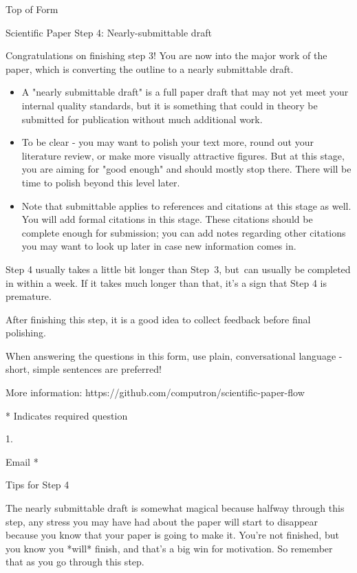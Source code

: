\documentclass[]{article}
\date{}
\begin{document}
Top of Form

Scientific Paper Step 4: Nearly-submittable draft

Congratulations on finishing step 3! You are now into the major work of
the paper, which is converting the outline to a nearly submittable
draft.

\begin{itemize}
\item
  A "nearly submittable draft" is a full paper draft that may not yet
  meet your internal quality standards, but it is something that could
  in theory be submitted for publication without much additional work.
\item
  To be clear - you may want to polish your text more, round out your
  literature review, or make more visually attractive figures. But at
  this stage, you are aiming for "good enough" and should mostly stop
  there. There will be time to polish beyond this level later.
\item
  Note that submittable applies to references and citations at this
  stage as well. You will add formal citations in this stage. These
  citations should be complete enough for submission; you can add notes
  regarding other citations you may want to look up later in case new
  information comes in. ~
\end{itemize}

Step 4 usually takes a little bit longer than Step~3, but~can usually be
completed in within a week. If it takes much longer than that, it's a
sign that Step 4 is premature.~

After finishing this step, it is a good idea to collect feedback before
final polishing.

When answering the questions in this form, use plain, conversational
language - short, simple sentences are preferred!

More information: https://github.com/computron/scientific-paper-flow

* Indicates required question

1.

Email *

Tips for Step 4

The nearly submittable draft is somewhat magical because halfway through
this step, any stress you may have had about the paper will start to
disappear because you know that your paper is going to make it. You're
not finished, but you know you *will* finish, and that's a big win for
motivation. So remember that as you go through this step.
\end{document}
